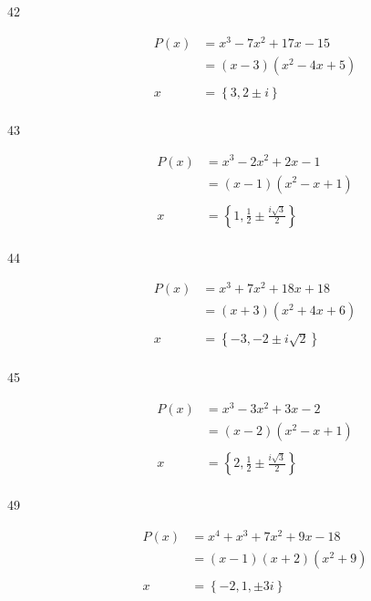 \documentclass{exam}
\begin{document}
\begin{description}
      \item[42]
        \begin{align*}
          P(x) &= x^3 - 7x^2 + 17x - 15 \\
               &= (x - 3) (x^2 - 4x + 5) \\
               \\
          x    &= \boxed{\left\{ 3, 2 \pm i \right\}} \\
        \end{align*}

      \item[43]
        \begin{align*}
          P(x) &= x^3 - 2x^2 + 2x - 1 \\
               &= (x-1) \left( x^2-x+1 \right) \\
               \\
          x    &= \boxed{\left\{ 1, \frac{1}{2} \pm \frac{i \sqrt{3}}{2} \right\}} \\
        \end{align*}

      \item[44]
        \begin{align*}
          P(x) &= x^3 + 7x^2 + 18x + 18 \\
               &= (x+3) (x^2 + 4x + 6) \\
               \\
          x    &= \boxed{\left\{ -3, -2 \pm i \sqrt{2} \right\}} \\
        \end{align*}

      \item[45]
        \begin{align*}
          P(x) &= x^3 - 3x^2 + 3x - 2 \\
               &= (x-2)(x^2 - x + 1) \\
               \\
          x    &= \boxed{\left\{ 2, \frac{1}{2} \pm \frac{i \sqrt{3}}{2} \right\}} \\
        \end{align*}

      \item[49]
        \begin{align*}
          P(x) &= x^4 + x^3 + 7x^2 + 9x - 18 \\
               &= (x-1) (x+2) (x^2 + 9) \\
               \\
          x    &= \boxed{\left\{ -2, 1, \pm 3i \right\}} \\
        \end{align*}


\end{description}
\end{document}
